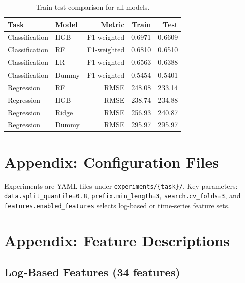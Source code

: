 \documentclass[runningheads]{llncs}
\begin{document}
\begin{table}[H]
    \centering
    \caption{Train-test comparison for all models.}
    \label{tab:app-overfitting}
    \begin{tabularx}{\textwidth}{llrrr}
        \toprule
        Task & Model & Metric & Train & Test \\
        \midrule
        Classification & HGB & F1-weighted & 0.6971 & 0.6609 \\
        Classification & RF & F1-weighted & 0.6810 & 0.6510 \\
        Classification & LR & F1-weighted & 0.6563 & 0.6388 \\
        Classification & Dummy & F1-weighted & 0.5454 & 0.5401 \\
        \midrule
        Regression & RF & RMSE & 248.08 & 233.14 \\
        Regression & HGB & RMSE & 238.74 & 234.88 \\
        Regression & Ridge & RMSE & 256.93 & 240.87 \\
        Regression & Dummy & RMSE & 295.97 & 295.97 \\
        \bottomrule
    \end{tabularx}
\end{table}

\section{Appendix: Configuration Files}
\label{app:configs}
Experiments are YAML files under
\texttt{experiments/\{task\}/}. Key parameters:
\texttt{data.split\_quantile=0.8},
\texttt{prefix.min\_length=3},
\texttt{search.cv\_folds=3}, and
\texttt{features.enabled\_features} selects
log-based or time-series feature sets.

\section{Appendix: Feature Descriptions}
\label{app:features}

\subsection{Log-Based Features (34 features)}
\end{document}
